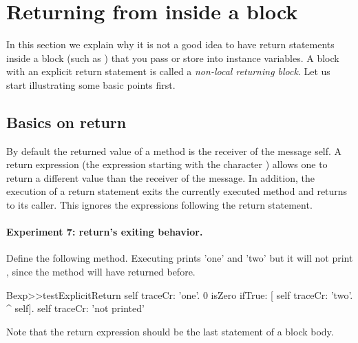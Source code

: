 \documentclass[a4paper,10pt,twoside]{book}
\begin{document}
\section{Returning from inside a block}
In this section we explain why it is  not a good idea to have return statements inside a block (such as \ct{[^ 33]}) that you pass or store into instance variables. A block with an explicit return statement is called a \emph{non-local returning block}. Let us start illustrating some basic points first.

\subsection{Basics on return}

By default the returned value of a method is the receiver of the message \ie self.
A return expression (the expression starting with the character \ct{^}) allows one to return a different value than the receiver of the message. In addition, the execution of a return statement exits the currently executed method and returns to its caller. This ignores the expressions following the return statement.

\paragraph{Experiment 7: return's exiting behavior.}
Define the following method. Executing   prints 'one' and 'two' but it will not print , since the method  will have returned before.

\begin{code}{}
Bexp>>testExplicitReturn
	self traceCr: 'one'.
	0 isZero ifTrue: [ self traceCr: 'two'. ^ self].
	self traceCr: 'not printed'
\end{code}

Note that the return expression should be the last statement of a block body.

%
%
\end{document}
